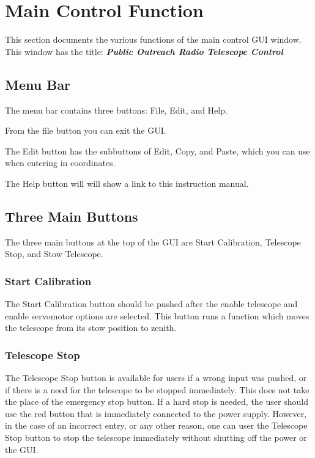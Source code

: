 \documentclass{article}
\begin{document}
\section{Main Control Function}
This section documents the various functions of the main control GUI window. This window has the title: \textbf{\textit{Public Outreach Radio Telescope Control}}
\subsection{Menu Bar}

The menu bar contains three buttons: File, Edit, and Help.

From the file button you can exit the GUI.

The Edit button has the subbuttons of Edit, Copy, and Paste, which you can use when entering in coordinates.

The Help button will will show a link to this instruction manual.

\subsection{Three Main Buttons}

The three main buttons at the top of the GUI are Start Calibration, Telescope Stop, and Stow Telescope.

\subsubsection{Start Calibration}

The Start Calibration button should be pushed after the enable telescope and enable servomotor options are selected. This button runs a function which moves the telescope from its stow position to zenith.

\subsubsection{Telescope Stop}

The Telescope Stop button is available for users if a wrong input was pushed, or if there is a need for the telescope to be stopped immediately. This does not take the place of the emergency stop button. If a hard stop is needed, the user should use the red button that is immediately connected to the power supply. However, in the case of an incorrect entry, or any other reason, one can user the Telescope Stop button to stop the telescope immediately without shutting off the power or the GUI.
\end{document}
